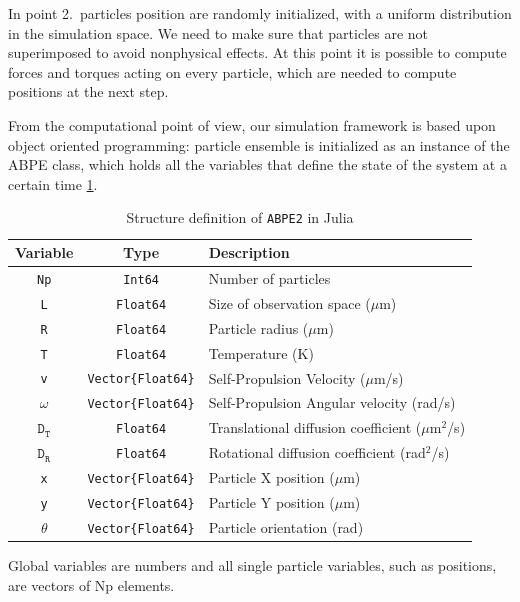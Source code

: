 \documentclass[../../master_thesis_np.tex]{subfiles}
\begin{document}
	In point 2.\ particles position are randomly initialized, with a uniform distribution in the simulation space. We need to make sure that particles are not superimposed to avoid nonphysical effects. At this point it is possible to compute forces and torques acting on every particle, which are needed to compute positions at the next step.  
	
	From the computational point of view, our simulation framework is based upon object oriented programming: particle ensemble is initialized as an instance of the ABPE class, which holds all the variables that define the state of the system at a certain time \ref{tab:ABPE2}. 
	\begin{table}[h]
		\centering
		\begin{tabular}{c|cl}
			\textbf{Variable} & \textbf{Type} & \textbf{Description} \\
			\hline
			\texttt{Np}  & \texttt{Int64} & Number of particles \\
			\texttt{L}   & \texttt{Float64} & Size of observation space ($\mu$m) \\
			\texttt{R}   & \texttt{Float64} & Particle radius ($\mu$m) \\
			\texttt{T}   & \texttt{Float64} & Temperature (K) \\
			\texttt{v}   & \texttt{Vector\{Float64\}} & Self-Propulsion Velocity ($\mu$m/s) \\
			\texttt{$\mathtt{\omega}$}   & \texttt{Vector\{Float64\}} & Self-Propulsion Angular velocity (rad/s) \\
			$\mathtt{D_T}$  & \texttt{Float64} & Translational diffusion coefficient ($\mu$m$^2$/s) \\
			$\mathtt{D_R}$  & \texttt{Float64} & Rotational diffusion coefficient (rad$^2$/s) \\
			\texttt{x}   & \texttt{Vector\{Float64\}} & Particle X position ($\mu$m) \\
			\texttt{y}   & \texttt{Vector\{Float64\}} & Particle Y position ($\mu$m) \\
			\texttt{$\mathtt{\theta}$}   & \texttt{Vector\{Float64\}} & Particle orientation (rad) \\
		\end{tabular}
		\caption{Structure definition of \texttt{ABPE2} in Julia}
		\label{tab:ABPE2}
	\end{table}
	Global variables are numbers and all single particle variables, such as positions, are vectors of Np elements. %
	
\end{document}
